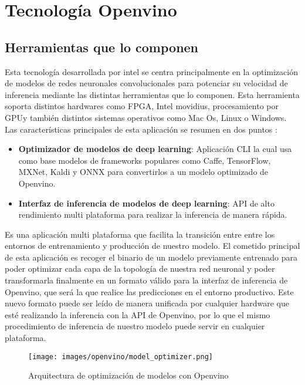 \cleardoublepage
\mbox{}


\chapter{Tecnología Openvino}
\label{ch:chapter3}


\section{Herramientas que lo componen}
Esta tecnología desarrollada por intel se centra principalmente en la optimización de modelos de redes neuronales convolucionales para potenciar su velocidad de inferencia mediante las distintas herramientas que lo componen.
Esta herramienta soporta distintos hardwares como FPGA, Intel movidius, procesamiento por GPU\@ y también distintos sistemas operativos como Mac Os, Linux o Windows.
Las características principales de esta aplicación se resumen en dos puntos :
\begin{itemize}
    \item \textbf{Optimizador de modelos de deep learning}: Aplicación CLI la cual usa como base modelos de frameworks populares como Caffe, TensorFlow, MXNet, Kaldi y ONNX para convertirlos a un modelo optimizado de Openvino.
    \item \textbf{Interfaz de inferencia de modelos de deep learning}: API de alto rendimiento multi plataforma para realizar la inferencia de manera rápida.
\end{itemize}

Es una aplicación multi plataforma que facilita la transición entre entre los entornos de entrenamiento y producción de nuestro modelo.
El cometido principal de esta aplicación es recoger el binario de un modelo previamente entrenado para poder optimizar cada capa de la topología de nuestra red neuronal y
poder transformarla finalmente en un formato válido para la interfaz de inferencia de Openvino, que será la que realice las predicciones en el entorno productivo.
Este nuevo formato puede ser leído de manera unificada por cualquier hardware que esté realizando la inferencia con la API de Openvino, por lo que el mismo procedimiento de inferencia de nuestro modelo
puede servir en cualquier plataforma.

\begin{figure}
    \centering
    \texttt{[image: images/openvino/model\_optimizer.png]}
    \caption{Arquitectura de optimización de modelos con Openvino}
    \label{fig:Arquitectura de optimización de modelos con Openvino}
\end{figure}

